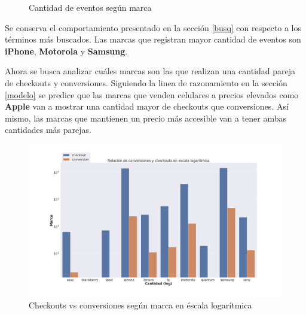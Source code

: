 \documentclass[a4paper]{article}
\begin{document}
\begin{figure}[h!]
	\caption{Cantidad de eventos según marca}
	\label{fig:freqbrands}
\end{figure}

Se conserva el comportamiento presentado en la sección \ref{busq} con respecto a los términos más buscados. Las marcas que registran mayor cantidad de eventos son \textbf{iPhone}, \textbf{Motorola} y \textbf{Samsung}.

Ahora se busca analizar cuáles marcas son las que realizan una cantidad pareja de checkouts y conversiones. Siguiendo la linea de razonamiento en la sección \ref{modelo} se predice que las marcas que venden celulares a precios elevados como \textbf{Apple} van a mostrar una cantidad mayor de checkouts que conversiones. Así mismo, las marcas que mantienen un precio más accesible van a tener ambas cantidades más parejas. 

\begin{figure}[h!]
	\includegraphics[width=\linewidth]{figures/142-conversiones_checkouts_marca-barplot.png}
	\caption{Checkouts vs conversiones según marca en éscala logarítmica}
	\label{fig:brands}
\end{figure}
\end{document}

